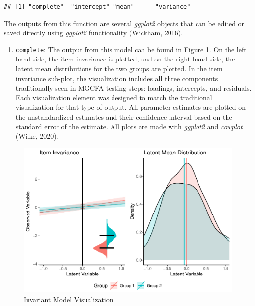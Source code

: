 \documentclass[
  man]{apa7}
\providecommand{\tightlist}{%
  \setlength{\itemsep}{0pt}\setlength{\parskip}{0pt}}
\begin{document}
\normalsize

\begin{verbatim}
## [1] "complete"  "intercept" "mean"      "variance"
\end{verbatim}

The outputs from this function are several \emph{ggplot2} objects that can be edited or saved directly using \emph{ggplot2} functionality (Wickham, 2016).

\begin{enumerate}
\def\labelenumi{\arabic{enumi})}
\tightlist
\item
  \texttt{complete}: The output from this model can be found in Figure \ref{fig:invariant-pic}. On the left hand side, the item invariance is plotted, and on the right hand side, the latent mean distributions for the two groups are plotted. In the item invariance sub-plot, the visualization includes all three components traditionally seen in MGCFA testing steps: loadings, intercepts, and residuals. Each visualization element was designed to match the traditional visualization for that type of output. All parameter estimates are plotted on the unstandardized estimates and their confidence interval based on the standard error of the estimate. All plots are made with \emph{ggplot2} and \emph{cowplot} (Wilke, 2020).
\end{enumerate}

\begin{figure}
\centering
\includegraphics{manuscript_files/figure-latex/invariant-pic-1.pdf}
\caption{\label{fig:invariant-pic}Invariant Model Visualization}
\end{figure}
\end{document}
